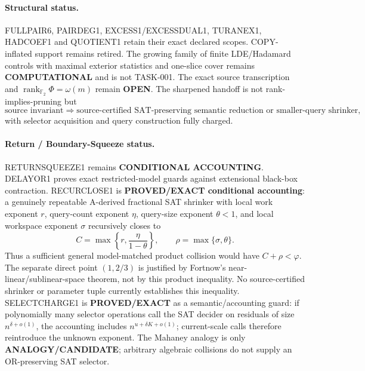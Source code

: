 \documentclass[11pt]{article}
\begin{document}
\paragraph{Structural status.}
FULLPAIR6, PAIRDEG1, EXCESS1/EXCESSDUAL1, TURANEX1, HADCOEF1 and QUOTIENT1 retain
their exact declared scopes. COPY-inflated support remains retired. The growing family of
finite LDE/Hadamard controls with maximal exterior statistics and one-slice cover remains
\textbf{COMPUTATIONAL} and is not TASK-001. The exact source transcription and
\(\operatorname{rank}_{\mathbb F_2}\Phi=\omega(m)\) remain \textbf{OPEN}.
The sharpened handoff is not rank-implies-pruning but
\[
\text{source invariant}
\Longrightarrow
\text{source-certified SAT-preserving semantic reduction or smaller-query shrinker},
\]
with selector acquisition and query construction fully charged.

\paragraph{Return / Boundary-Squeeze status.}
RETURNSQUEEZE1 remains \textbf{CONDITIONAL ACCOUNTING}. DELAYOR1 proves exact restricted-model
guards against extensional black-box contraction. RECURCLOSE1 is \textbf{PROVED/EXACT
conditional accounting}: a genuinely repeatable A-derived fractional SAT shrinker with
local work exponent \(r\), query-count exponent \(\eta\), query-size exponent \(\theta<1\),
and local workspace exponent \(\sigma\) recursively closes to
\[
C=\max\left\{r,\frac{\eta}{1-\theta}\right\},
\qquad
\rho=\max\{\sigma,\theta\}.
\]
Thus a sufficient general model-matched product collision would have
\(C+\rho<\varphi\).  The separate direct point $(1,2/3)$ is justified by
Fortnow's near-linear/sublinear-space theorem, not by this product inequality.
No source-certified shrinker or parameter tuple currently establishes this inequality.
SELECTCHARGE1 is \textbf{PROVED/EXACT} as a semantic/accounting guard: if polynomially
many selector operations call the SAT decider on residuals of size \(n^{\delta+o(1)}\),
the accounting includes \(n^{u+\delta K+o(1)}\); current-scale calls therefore reintroduce
the unknown exponent. The Mahaney analogy is only \textbf{ANALOGY/CANDIDATE}; arbitrary
algebraic collisions do not supply an OR-preserving SAT selector.
\end{document}
